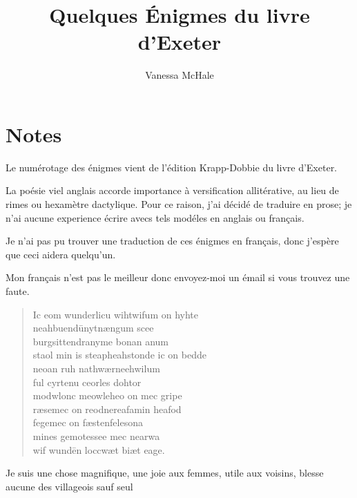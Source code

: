 \documentclass{article}
\newcommand{\attrib}[1]{%
\nopagebreak{\raggedleft\footnotesize #1\par}}
\begin{document}
\title{Quelques \'Enigmes du livre d'Exeter}
\author{Vanessa McHale}
\maketitle

\section{Notes}
Le num\'erotage des \'enigmes vient de l'\'edition Krapp-Dobbie du livre d'Exeter.

La po\'esie viel anglais accorde importance \`a versification allit\'erative, au lieu de rimes ou hexam\`etre dactylique. Pour ce raison, j'ai d\'ecid\'e de traduire en prose; je n'ai aucune experience \'ecrire avecs tels mod\'eles en anglais ou fran\c{c}ais. 

Je n'ai pas pu trouver une traduction de ces \'enigmes en fran\c{c}ais, donc j'esp\`ere que ceci aidera quelqu'un. 

Mon fran\c{c}ais n'est pas le meilleur donc envoyez-moi un \'email si vous trouvez une faute. 

\begin{verse}
Ic eom wunderlicu wiht\qquad     wifum on hyhte\\
neahbuend\=unyt\qquad     n\ae ngum sce\th\th e\\
burgsittendra\qquad     nym\th e bonan anum\\
sta\th ol min is steapheah\qquad     stonde ic on bedde\\
neo\th an ruh nathw\ae r\qquad     ne\th e\dh hwilum\\
ful cyrtenu \qquad     ceorles dohtor\\
modwlonc meowle\qquad     \TH  heo on mec gripe\dh\\
r\ae se\dh mec on reodne\qquad     reafa\dh min heafod\\
fege\dh mec on f\ae sten\qquad     fele\th sona\\
mines gemotes\qquad     se\th e mec nearwa\dh\\
wif wund\=en locc\qquad     w\ae t bi\dh \th\ae t eage.
\end{verse}
\attrib{Livre d'Exeter}

Je suis une chose magnifique,    une joie aux femmes,
utile aux voisins,    blesse aucune
des villageois    sauf seul 
\end{document}
